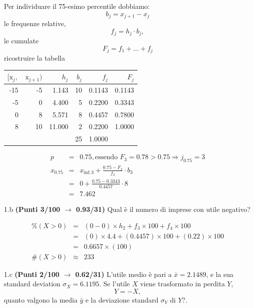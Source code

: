 \documentclass[
  11pt,
]{book}
\theoremstyle{mytheoremstyle}
\theoremstyle{mydefstyle}
\newenvironment{sol}
  {
  \begin{tcolorbox}[enhanced,breakable,arc=0.1mm,boxrule=1pt,colback=white,colframe=iblue,
  title=\bf \fontfamily{lmss}\selectfont \hspace{.5 cm} Soluzione,drop fuzzy shadow]

}{
\end{tcolorbox}
  }
\begin{document}
\begin{sol}
Per individuare il 75-esimo percentile dobbiamo:
\[
b_j=x_{j+1}-x_{j}
\]
le frequenze relative,
\[
f_j=h_j\cdot b_j,
\]
le cumulate
\[
F_j=f_1+...+f_j
\]
ricostruire la tabella

\begin{table}[H]
\centering
\begin{tabular}{rrrrrr}
\toprule
$[\text{x}_j,$ & $\text{x}_{j+1})$ & $h_j$ & $b_j$ & $f_j$ & $F_j$\\
\midrule
-15 & -5 & 1.143 & 10 & 0.1143 & 0.1143\\
-5 & 0 & 4.400 & 5 & 0.2200 & 0.3343\\
0 & 8 & 5.571 & 8 & 0.4457 & 0.7800\\
8 & 10 & 11.000 & 2 & 0.2200 & 1.0000\\
 &  &  & 25 & 1.0000 & \\
\bottomrule
\end{tabular}
\end{table}

\begin{eqnarray*}
  p &=&  0.75 , \text{essendo }F_{ 3 }= 0.78  > 0.75  \Rightarrow j_{ 0.75 }= 3 \\
  x_{ 0.75 } &=& x_{\text{inf}; 3 } + \frac{ { 0.75 } - F_{ 2 }} {f_{ 3 }} \cdot b_{ 3 } \\
            &=&  0  + \frac {{ 0.75 } -  0.3343 } { 0.4457 } \cdot  8  \\
            &=&  7.462 
\end{eqnarray*}

\end{sol}

1.b \textbf{(Punti 3/100 \(\rightarrow\) 0.93/31)} Qual è il numero di imprese con utile negativo?

\begin{sol}
\begin{eqnarray*}
     \%(X> 0 ) &=& ( 0 - 0 )\times h_{ 2 }+ f_{ 3 }\times 100+f_{ 4 }\times 100 \\
              &=& ( 0 )\times 4.4 + ( 0.4457 )\times 100+( 0.22 )\times 100 \\
              &=&  0.6657 \times(100)\\
     \#(X> 0 ) &\approx& 233 
         \end{eqnarray*}

\end{sol}

1.c \textbf{(Punti 2/100 \(\rightarrow\) 0.62/31)} L'utile medio è pari a \(\bar x=2.1489\), e la sua standard deviation
\(\sigma_X=6.1195\). Se l'utile \(X\) viene trasformato in perdita \(Y\),
\[
Y=-X,
\]
quanto valgono la media \(\bar y\) e la deviazione standard \(\sigma_Y\) di \(Y\)?.
\end{document}
